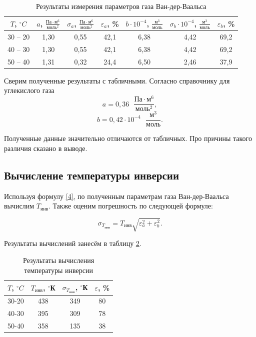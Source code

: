 \documentclass[a4paper,12pt]{article} %
\begin{document}
\begin{table}[H]
	\centering
	\begin{tabular}{|c|c|c|c|c|c|c|}
		\hline
		$ T $, $ ^\circ C $ & $ a $, $\displaystyle \frac{\text{Па}\cdot\text{м}^6}{\text{моль}^2} $ &$ \sigma_a $, $\displaystyle \frac{\text{Па}\cdot\text{м}^6}{\text{моль}^2} $ & $ \varepsilon_a $, \% & $ b\cdot10^{-4} $, $ \displaystyle\frac{\text{м}^3}{\text{моль}} $ & $ \sigma_b \cdot 10^{-4} $, $\displaystyle \frac{\text{м}^3}{\text{моль}} $ & $ \varepsilon_b $, \% \\ \hline
		30 -- 20 & 1,30 & 0,55 & 42,1 & 6,38 & 4,42 & 69,2 \\ \hline
            40 -- 30 & 1,30 & 0,55 & 42,1 & 6,38 & 4,42 & 69,2 \\ \hline
		50 -- 40 & 1,31 & 0,32 & 24,4 & 6,50 & 2,46 & 37,9 \\ \hline
	\end{tabular}
	\caption{Результаты измерения параметров газа Ван-дер-Ваальса}
	\label{tab:a-b}
\end{table}

Сверим полученные результаты с табличными. Согласно справочнику для углекислого газа \[ a = 0,36 \text{ } \frac{\text{Па}\cdot\text{м}^6}{\text{моль}^2}, \] \[ b = 0,42\cdot 10^{-4} \text{ }\frac{\text{м}^3}{\text{моль}}. \]

Полученные данные значительно отличаются от табличных. Про причины такого различия сказано в выводе.

\subsection*{Вычисление температуры инверсии}

Используя формулу \eqref{4}, по полученным параметрам газа Ван-дер-Ваальса вычислим $ T_\text{инв} $. Также оценим погрешность по следующей формуле:

\[ \sigma_{T_\text{инв}} = T_\text{инв}\sqrt{\varepsilon^2_a+\varepsilon_b^2}. \]

Результаты вычислений занесём в таблицу \ref{tab:temp}.

\begin{table}[H]
	\centering
	\begin{tabular}{|c|c|c|c|}
		\hline
		$ T $, $ ^\circ C $ & $ T_\text{инв} $, $ ^\circ $К & $ \sigma_{T_\text{инв}} $, $ ^\circ $К & $ \varepsilon $, \% \\ \hline
		30-20 & 438 & 349 & 80 \\ \hline
            40-30 & 395 & 309 & 78 \\ \hline
		50-40 & 358 & 135 & 38 \\ \hline
	\end{tabular}
	\caption{Результаты вычисления температуры инверсии}
	\label{tab:temp}
\end{table}
\end{document}
